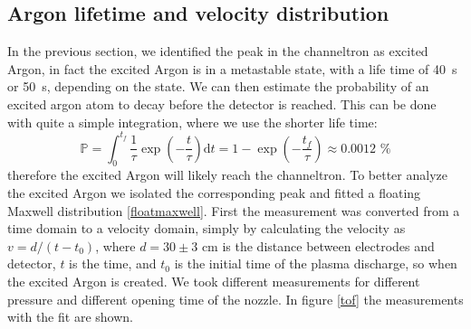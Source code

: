 \documentclass[a4paper,10pt]{article}
\begin{document}
\subsection{Argon lifetime and velocity distribution}
In the previous section, we identified the peak in the channeltron as excited Argon, in fact the excited Argon is in a metastable state, with a life time of \SI{40}{\s} or \SI{50}{\s}, depending on the state.\cite{lifetime}
We can then estimate the probability of an excited argon atom to decay before the detector is reached. This can be done with quite a simple integration, where we use the shorter life time:
\begin{equation}
	\mathbb{P} = \int_0^{t_f} \frac{1}{\tau} \exp(-\frac{t}{\tau}) \mathrm{d}t = 1 - \exp(-\frac{t_f}{\tau}) \approx 0.0012 \,\,\%
\end{equation}
therefore the excited Argon will likely reach the channeltron. To better analyze the excited Argon we isolated the corresponding peak and fitted a floating Maxwell distribution \eqref{floatmaxwell}. First the measurement was converted from a time domain to a velocity domain, simply by calculating the velocity as $v = d/(t-t_0)$, where $d = 30\pm 3$ cm is the distance between electrodes and detector, $t$ is the time, and $t_0$ is the initial time of the plasma discharge, so when the excited Argon is created. We took different measurements for different pressure and different opening time of the nozzle. In figure \ref{tof} the measurements with the fit are shown.
\end{document}
